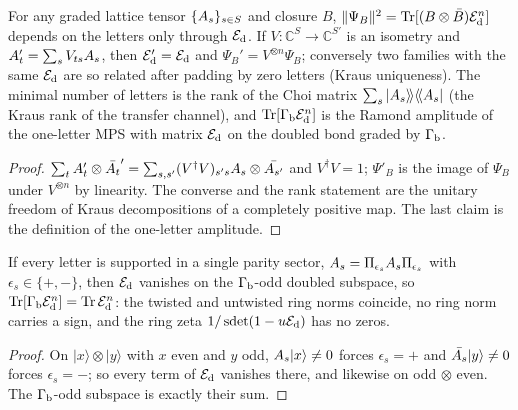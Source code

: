 \begin{proposition}
\label{prop:letters-transfer-invariance}
For any graded lattice tensor $\{A_{s}\}_{s\in S}$ and closure $B$, $\|\Psi_B\|^2 = \operatorname{Tr}[(B\otimes\bar B)\mathcal E_{\mathrm d}^n]$
depends on the letters only through $\mathcal E_{\mathrm d}$. If $V\colon\mathbb C^S\to\mathbb C^{S'}$ is an isometry and
$A_{t}' = \sum_sV_{ts}A_{s}$, then $\mathcal E_{\mathrm d}' = \mathcal E_{\mathrm d}$ and $\Psi_B' = V^{\otimes n}\Psi_B$; conversely two
families with the same $\mathcal E_{\mathrm d}$ are so related after padding by zero letters (Kraus uniqueness). The
minimal number of letters is the rank of the Choi matrix $\sum_s|A_{s}\rangle\!\rangle\langle\!\langle A_{s}|$
(the Kraus rank of the transfer channel), and $\operatorname{Tr}[\Gamma_{\mathrm b}\mathcal E_{\mathrm d}^n]$ is the Ramond amplitude of the
one-letter MPS with matrix $\mathcal E_{\mathrm d}$ on the doubled bond graded by $\Gamma_{\mathrm b}$.
\end{proposition}

\begin{proof}
$\sum_tA_{t}'\otimes\bar{A_{t}}' = \sum_{s,s'}(V^\dagger V)_{s's}A_{s}\otimes\bar{A_{s'}}$ and $V^\dagger V = 1$;
$\Psi'_B$ is the image of $\Psi_B$ under $V^{\otimes n}$ by linearity. The converse and the rank
statement are the unitary freedom of Kraus decompositions of a completely positive map. The last
claim is the definition of the one-letter amplitude.
\end{proof}

\begin{lemma}
\label{lem:sector-separating-letters}
If every letter is supported in a single parity sector, $A_{s} = \Pi_{\epsilon_s}A_{s}\Pi_{\epsilon_s}$
with $\epsilon_s\in\{+,-\}$, then $\mathcal E_{\mathrm d}$ vanishes on the $\Gamma_{\mathrm b}$-odd doubled subspace, so
$\operatorname{Tr}[\Gamma_{\mathrm b}\mathcal E_{\mathrm d}^n] = \operatorname{Tr}\mathcal E_{\mathrm d}^n$: the twisted and untwisted ring norms coincide, no ring norm carries a
sign, and the ring zeta $1/\operatorname{sdet}(1-u\mathcal E_{\mathrm d})$ has no zeros.
\end{lemma}

\begin{proof}
On $|x\rangle\otimes|y\rangle$ with $x$ even and $y$ odd, $A_{s}|x\rangle\ne0$ forces $\epsilon_s = +$
and $\bar{A_{s}}|y\rangle\ne0$ forces $\epsilon_s = -$; so every term of $\mathcal E_{\mathrm d}$ vanishes there, and
likewise on odd $\otimes$ even. The $\Gamma_{\mathrm b}$-odd subspace is exactly their sum.
\end{proof}

